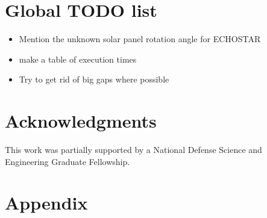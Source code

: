\documentclass[a4paper,twocolumn]{spaceDebrisC} %
\begin{document}
\section{Global TODO list}

\begin{itemize}
  \item Mention the unknown solar panel rotation angle for ECHOSTAR
  \item make a table of execution times
  \item Try to get rid of big gaps where possible
\end{itemize}

\section*{Acknowledgments}

This work was partially supported by a National Defense Science and Engineering Graduate Fellowship.

\section*{Appendix}
\end{document}

